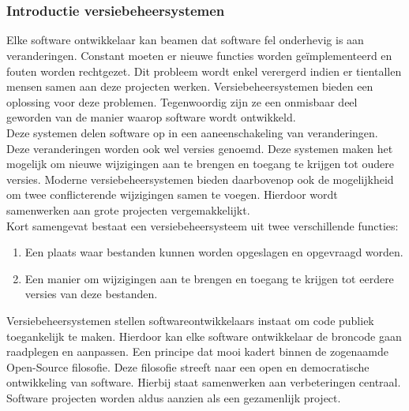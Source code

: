 
\chapter{}
\label{ch:inleiding}
\subsection{Introductie versiebeheersystemen}
Elke software ontwikkelaar kan beamen dat software fel onderhevig is aan veranderingen. Constant moeten er nieuwe functies worden geïmplementeerd en fouten worden rechtgezet. Dit probleem wordt enkel verergerd indien er tientallen mensen samen aan deze projecten werken. Versiebeheersystemen bieden een oplossing voor deze problemen. Tegenwoordig zijn ze een onmisbaar deel geworden van de manier waarop software wordt ontwikkeld.\\

Deze systemen delen software op in een aaneenschakeling van veranderingen. Deze veranderingen worden ook wel versies genoemd. Deze systemen maken het mogelijk om nieuwe wijzigingen aan te brengen en toegang te krijgen tot oudere versies. Moderne versiebeheersystemen bieden daarbovenop ook de mogelijkheid om twee conflicterende wijzigingen samen te voegen. Hierdoor wordt samenwerken aan grote projecten vergemakkelijkt.\\

Kort samengevat bestaat een versiebeheersysteem uit twee verschillende functies:

\begin{enumerate}
\item Een plaats waar bestanden kunnen worden opgeslagen en opgevraagd worden.
\item Een manier om wijzigingen aan te brengen en toegang te krijgen tot eerdere versies van deze bestanden.
\end{enumerate}

Versiebeheersystemen stellen softwareontwikkelaars instaat om code publiek toegankelijk te maken. Hierdoor kan elke software ontwikkelaar de broncode gaan raadplegen en aanpassen. Een principe dat mooi kadert binnen de zogenaamde Open-Source filosofie. Deze filosofie streeft naar een open en democratische ontwikkeling van software. Hierbij staat samenwerken aan verbeteringen centraal. Software projecten worden aldus aanzien als een gezamenlijk project.

